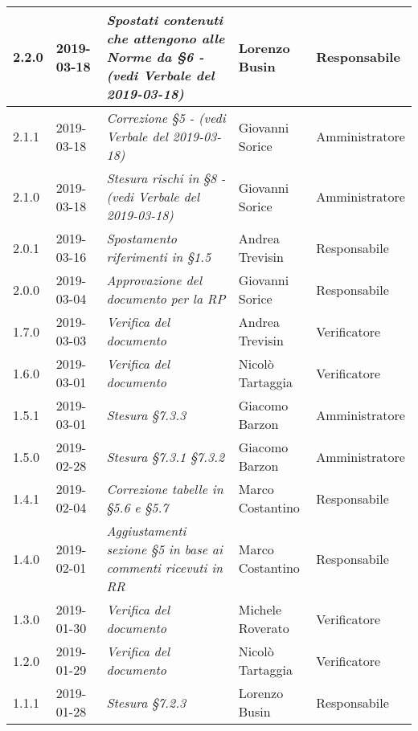 \begin{longtable}{C{2cm}|C{2.5cm}|C{4.5cm}|C{2.5cm}|C{3cm}}
		2.2.0 & 2019-03-18 & \emph{Spostati contenuti che attengono alle Norme da §6 - (vedi Verbale del 2019-03-18)} & Lorenzo Busin & Responsabile \\
		\hline
		
		2.1.1 & 2019-03-18 & \emph{Correzione §5 - (vedi Verbale del 2019-03-18)} & Giovanni Sorice & Amministratore \\
		\hline
		
		2.1.0 & 2019-03-18 & \emph{Stesura rischi in §8 - (vedi Verbale del 2019-03-18)} & Giovanni Sorice & Amministratore \\
		\hline
		
		2.0.1 & 2019-03-16 & \emph{Spostamento riferimenti in §1.5} & Andrea Trevisin & Responsabile \\
		\hline		

		2.0.0 & 2019-03-04 & \emph{Approvazione del documento per la RP} & Giovanni Sorice & Responsabile \\
		\hline

		1.7.0 & 2019-03-03 & \emph{Verifica del documento} & Andrea Trevisin & Verificatore \\
		\hline

		1.6.0 & 2019-03-01 & \emph{Verifica del documento} & Nicolò Tartaggia & Verificatore \\
		\hline

		1.5.1 & 2019-03-01 & \emph{Stesura §7.3.3} & Giacomo Barzon & Amministratore \\
		\hline

		1.5.0 & 2019-02-28 & \emph{Stesura §7.3.1 §7.3.2} & Giacomo Barzon & Amministratore \\
		\hline

		1.4.1 & 2019-02-04 & \emph{Correzione tabelle in §5.6 e §5.7} & Marco Costantino & Responsabile \\
		\hline

		1.4.0 & 2019-02-01 & \emph{Aggiustamenti sezione §5 in base ai commenti ricevuti in RR} & Marco Costantino & Responsabile \\
		\hline

		1.3.0 & 2019-01-30 & \emph{Verifica del documento} & Michele Roverato & Verificatore \\
		\hline

		1.2.0 & 2019-01-29 & \emph{Verifica del documento} & Nicolò Tartaggia & Verificatore \\
		\hline

		1.1.1 & 2019-01-28 & \emph{Stesura §7.2.3} & Lorenzo Busin & Responsabile \\
		\hline


\end{longtable}
